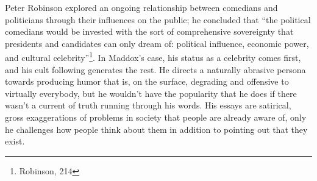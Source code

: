 Peter Robinson explored an ongoing relationship between comedians and
politicians through their influences on the public; he concluded that ``the
political comedians would be invested with the sort of comprehensive sovereignty
that presidents and candidates can only dream of: political influence, economic
power, and cultural celebrity''\footnote{Robinson, 214}. In Maddox's case, his
status as a celebrity comes first, and his cult following generates the rest. He
directs a naturally abrasive persona towards producing humor that is, on the
surface, degrading and offensive to virtually everybody, but he wouldn't have
the popularity that he does if there wasn't a current of truth running through
his words. His essays are satirical, gross exaggerations of problems in society
that people are already aware of, only he challenges how people think about them
in addition to pointing out that they exist.
